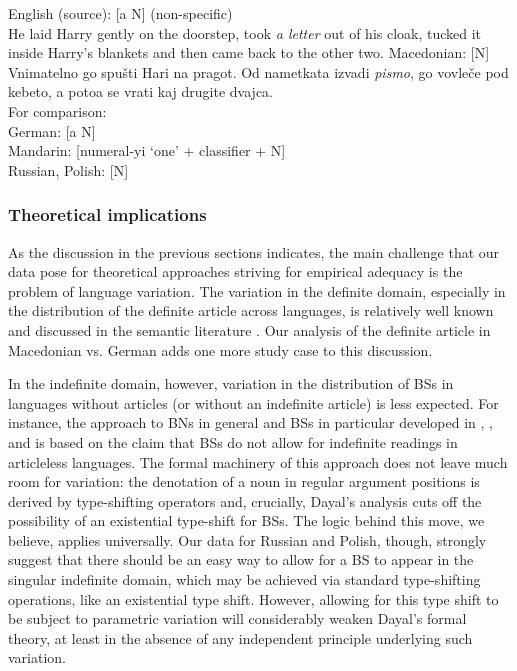 \documentclass[output=paper,colorlinks,citecolor=brown]{langscibook}
\begin{document}
\ea \ea \label{ex:3a} English (source):  [a  N]			\hfill				(non-specific)\\ He laid Harry gently on the doorstep, took \textit{a letter} out of his cloak, tucked it inside Harry’s blankets and then came back to the other two.
\ex \label{ex:3b} Macedonian: [N]\\
Vnimatelno go spušti Hari na pragot. Od nametkata izvadi \textit{pismo}, go vovleče pod kebeto, a potoa se vrati kaj drugite dvajca.\\
\ex For comparison: \\
	German: [a N]\\
	Mandarin: [numeral-yi \lq one' $+$ classifier $+$ N]\\
	Russian, Polish: [N]
\z\z
\fi

\subsubsection{Theoretical implications}

As the discussion in the previous sections indicates, the main challenge that our data pose for theoretical approaches striving for empirical adequacy is the problem of language variation. The variation in the definite domain, especially in the distribution of the definite article across languages, is relatively well known and discussed in the semantic literature \citep[e.g.,][]{Dryer2005}. Our analysis of the definite article in Macedonian vs. German adds one more study case to this discussion. 

In the indefinite domain, however, variation in the distribution of BSs in languages without articles (or without an indefinite article) is less expected. For instance, the approach to BNs in general and BSs in particular developed in \citet{Dayal2004}, \citet{Dayal2018}, and \citet{DayalSag2020} is based on the claim that BSs do not allow for indefinite readings in articleless languages. The formal machinery of this approach does not leave much room for variation: the denotation of a noun in regular argument positions is derived by type-shifting operators and, crucially, Dayal's analysis cuts off the possibility of an existential type-shift for BSs. The logic behind this move, we believe, applies universally. Our data for Russian and Polish, though, strongly suggest that there should be an easy way to allow for a BS to appear in the singular indefinite domain, which may be achieved via standard type-shifting operations, like an existential type shift. However, allowing for this type shift to be subject to parametric variation will considerably weaken Dayal's formal theory, at least in the absence of any independent principle underlying such variation. 
\end{document}
